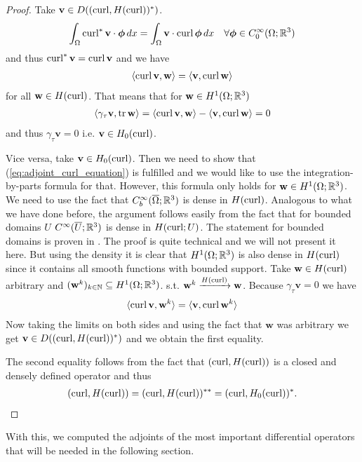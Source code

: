 \documentclass[../master_thesis.tex]{subfiles}
\begin{document}
\begin{proof}
    Take $\mathbf{v} \in D((\operatorname{curl}, H(\operatorname{curl}))^*)$. 
    \begin{align*}
        \int_\Omega \operatorname{curl}^*\mathbf{v} \cdot \boldsymbol{\phi} \, dx
        = \int_\Omega \mathbf{v} \cdot \operatorname{curl} \boldsymbol{\phi} \, dx
            \quad \forall \boldsymbol{\phi} \in C_0^\infty(\Omega;\mathbb{R}^3)
    \end{align*}
    and thus $\operatorname{curl}^* \mathbf{v} = \operatorname{curl} \mathbf{v}$ and we have 
    \begin{align}
        \langle \operatorname{curl} \mathbf{v}, \mathbf{w} \rangle
        = \langle \mathbf{v}, \operatorname{curl} \mathbf{w} \rangle \label{eq:adjoint_curl_equation}
    \end{align}
    for all $\mathbf{w} \in H(\operatorname{curl})$. That means that for $\mathbf{w} \in H^1(\Omega;\mathbb{R}^3)$
    \begin{align*}
        \langle \gamma_\tau \mathbf{v}, \operatorname{tr} \mathbf{w} \rangle 
        =  \langle \operatorname{curl} \mathbf{v}, \mathbf{w} \rangle - \langle \mathbf{v}, \operatorname{curl} \mathbf{w} \rangle
        = 0
    \end{align*}
    and thus $\gamma_\tau \mathbf{v} = 0$ i.e. $\mathbf{v} \in H_0(\operatorname{curl})$.

    Vice versa, take $\mathbf{v} \in H_0(\operatorname{curl})$. Then we need to show that 
    (\ref{eq:adjoint_curl_equation}) is fulfilled and we would like to use the integration-by-parts formula 
    for that. However, this formula only holds for $\mathbf{w} \in H^1(\Omega;\mathbb{R}^3)$. 
    We need to use the fact that $C_b^\infty(\overline{\Omega};\mathbb{R}^3)$ is 
    dense in $H(\operatorname{curl})$. Analogous to what we have done before, the argument follows easily from the fact that 
    for bounded domains $U$ $C^\infty(\overline{U};\mathbb{R}^3)$ is dense in $H(\operatorname{curl};U)$. 
    The statement for bounded domains is proven in \cite[Lemma 3.27]{monk}. 
    The proof is quite technical 
    and we will not present it here. But using the density it is clear that 
    $H^1(\Omega;\mathbb{R}^3)$ is also dense in $H(\operatorname{curl})$ since it contains all smooth functions 
    with bounded support. Take $\mathbf{w} \in H(\operatorname{curl})$ arbitrary and 
    $(\mathbf{w}^k)_{k \in \mathbb{N}} \subseteq H^1(\Omega;\mathbb{R}^3)$.
    s.t. $\mathbf{w}^k \xrightarrow{H(\operatorname{curl})} \mathbf{w}$.
    Because $\gamma_\tau \mathbf{v} = 0$ we have 
    \begin{align*}
        \langle \operatorname{curl} \mathbf{v}, \mathbf{w}^k \rangle
        = \langle \mathbf{v}, \operatorname{curl} \mathbf{w}^k \rangle
    \end{align*}
    Now taking the limits on both sides and using the fact that $\mathbf{w}$ was 
    arbitrary we get $\mathbf{v} \in D((\operatorname{curl}, H(\operatorname{curl}))^*)$ and 
    we obtain the first equality. 

    The second equality follows from the fact that $(\operatorname{curl}, H(\operatorname{curl}))$ is 
    a closed and densely defined operator and thus 
    \begin{align*}
        (\operatorname{curl}, H(\operatorname{curl}))= (\operatorname{curl}, H(\operatorname{curl}))^{**} = (\operatorname{curl}, H_0(\operatorname{curl}))^*.
    \end{align*}
\end{proof}
With this, we computed the adjoints of the most important differential operators that 
will be needed in the following section. 
\end{document}
